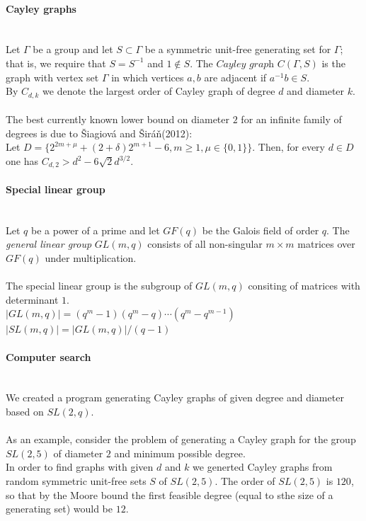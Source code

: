 \documentclass[portrait,a0,final]{a0poster}
\begin{document}
\begin{multicols}{3}
\paragraph{Cayley graphs}  
~\\
Let $\Gamma$ be a group and let $S\subset \Gamma$ be a symmetric unit-free generating set for $\Gamma$; that is, we require that $S=S^{-1}$ and $1\notin S$. 
The $\textit{Cayley graph}$ $C(\Gamma,S)$ is the graph with vertex set $\Gamma$ in which vertices $a,b$ are adjacent if $a^{-1}b\in S$. ~\\

By $C_{d,k}$ we denote the largest order of Cayley graph of degree $d$ and diameter $k$. ~\\
The best currently known lower bound on diameter $2$ for an infinite family of degrees is due to \v{S}iagiov\'a and \v{S}ir\'a\v{n}(2012): ~\\
Let $D = \{ 2^{2m+\mu}+    (2+\delta)2^{m+1}-6,m \geq 1, \mu \in \{0,1\} \}$. Then, for every $d\in D$ one has $C_{d,2} > d^{2} - 6\sqrt{2}d^{3/2}$.

\paragraph{Special linear group}  
~\\
Let $q$ be a power of a prime and let $GF(q)$ be the Galois field of order $q$. The {\em general linear group} $GL(m,q)$ consists of all non-singular $m\times m$ matrices over $GF(q)$ under multiplication. \\~\\
The special linear group is the subgroup of $GL(m,q)$ consiting of matrices with determinant $1$.
~\\
$|GL(m,q)| = (q^m - 1)(q^m - q) \cdots (q^m - q^{m-1})$
~\\
$|SL(m,q)| = |GL(m,q)|/(q-1)$
~\\
\paragraph{Computer search}
~\\
We created a program generating Cayley graphs of given degree and diameter based on $SL(2,q)$. \\~\\
As an example, consider the problem of generating a Cayley graph for the group $SL(2,5)$ of diameter $2$ and minimum possible degree.
~\\
In order to find graphs with given $d$ and $k$ we generted Cayley graphs from random symmetric unit-free sets $S$ of $SL(2,5)$.
The order of $SL(2,5)$ is $120$, so that by the Moore bound the first feasible degree (equal to sthe size of a generating set) would be $12$.


\end{multicols}
\end{document}
